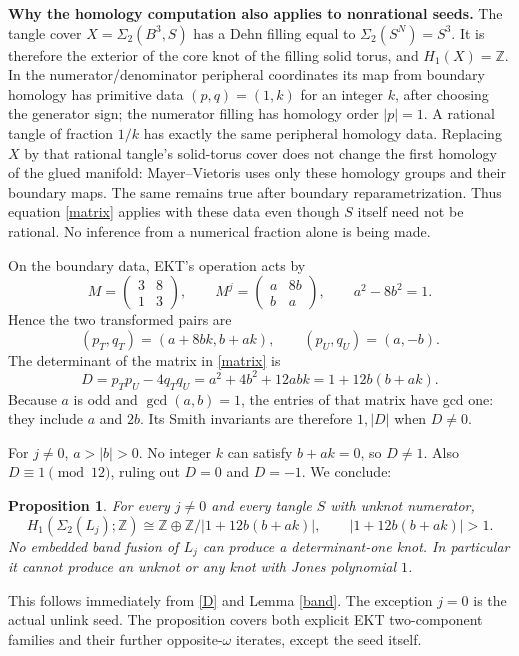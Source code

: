 \documentclass[11pt]{article}
\newtheorem{proposition}{Proposition}
\newcommand{\Z}{\mathbb Z}
\newcommand{\Sig}{\Sigma_2}
\begin{document}
\textbf{Why the homology computation also applies to nonrational seeds.}
The tangle cover $X=\Sig(B^3,S)$ has a Dehn filling equal to $\Sig(S^N)=S^3$. It is therefore the exterior of the core knot of the filling solid torus, and $H_1(X)=\Z$. In the numerator/denominator peripheral coordinates its map from boundary homology has primitive data $(p,q)=(1,k)$ for an integer $k$, after choosing the generator sign; the numerator filling has homology order $|p|=1$. A rational tangle of fraction $1/k$ has exactly the same peripheral homology data. Replacing $X$ by that rational tangle's solid-torus cover does not change the first homology of the glued manifold: Mayer--Vietoris uses only these homology groups and their boundary maps. The same remains true after boundary reparametrization. Thus equation \eqref{matrix} applies with these data even though $S$ itself need not be rational. No inference from a numerical fraction alone is being made.

On the boundary data, EKT's operation acts by
\[
M=\begin{pmatrix}3&8\\1&3\end{pmatrix},\qquad
M^j=\begin{pmatrix}a&8b\\b&a\end{pmatrix},\qquad a^2-8b^2=1.
\]
Hence the two transformed pairs are
\[
(p_T,q_T)=(a+8bk,b+ak),\qquad (p_U,q_U)=(a,-b).
\]
The determinant of the matrix in \eqref{matrix} is
\begin{equation}\label{D}
D=p_Tp_U-4q_Tq_U
=a^2+4b^2+12abk=1+12b(b+ak).
\end{equation}
Because $a$ is odd and $\gcd(a,b)=1$, the entries of that matrix have gcd one: they include $a$ and $2b$. Its Smith invariants are therefore $1,|D|$ when $D\ne0$.

For $j\ne0$, $a>|b|>0$. No integer $k$ can satisfy $b+ak=0$, so $D\ne1$. Also $D\equiv1\pmod {12}$, ruling out $D=0$ and $D=-1$. We conclude:
\begin{proposition}\label{main}
For every $j\ne0$ and every tangle $S$ with unknot numerator,
\[
H_1(\Sig(L_j);\Z)\cong\Z\oplus\Z/|1+12b(b+ak)|,
\qquad |1+12b(b+ak)|>1.
\]
No embedded band fusion of $L_j$ can produce a determinant-one knot. In particular it cannot produce an unknot or any knot with Jones polynomial $1$.
\end{proposition}
This follows immediately from \eqref{D} and Lemma \ref{band}. The exception $j=0$ is the actual unlink seed. The proposition covers both explicit EKT two-component families and their further opposite-$\omega$ iterates, except the seed itself.
\end{document}

